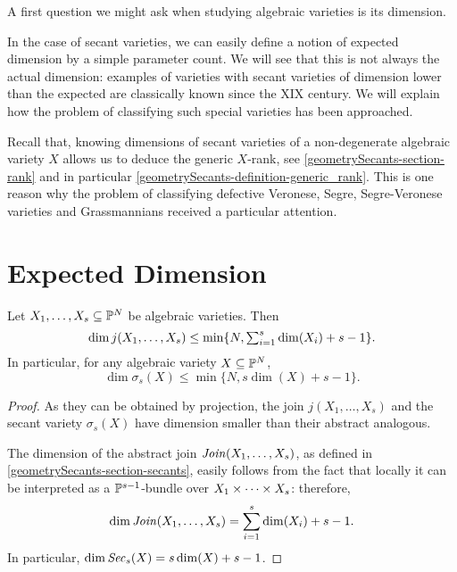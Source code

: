 
A first question we might ask when studying algebraic varieties is its dimension. 

In the case of secant varieties, we can easily define a notion of expected dimension by a simple parameter count. We will see that this is not always the actual dimension: examples of varieties with secant varieties of dimension lower than the expected are classically known since the XIX century. We will explain how the problem of classifying such special varieties has been approached.

Recall that, knowing dimensions of secant varieties of a non-degenerate algebraic variety $X$ allows us to deduce the generic $X$-rank, see \ref{geometrySecants-section-rank} and in particular \ref{geometrySecants-definition-generic_rank}. This is one reason why the problem of classifying defective Veronese, Segre, Segre-Veronese varieties and Grassmannians received a particular attention. 

\section{Expected Dimension}
\label{geometrySecants-section-expectedDimension}

\begin{lemma}
\label{geometrySecants-lemma-expecteddimension}
Let $X_1, \ldots , X_s \subseteq \mathbb{P}^N$ be algebraic varieties. Then 
\[
    \dim j(X_1, \ldots , X_s) \leq \min\{ N, \textstyle\sum_{i=1}^s \dim(X_i) + s-1\}.
\]
In particular, for any algebraic variety $X \subseteq \mathbb{P}^N$,  
\[
    \dim \sigma_s(X) \leq \min\{ N , s\dim(X) + s - 1\}.
\]
\end{lemma}
\begin{proof}
As they can be obtained by projection, the join $j(X_1,\ldots,X_s)$ and the secant variety $\sigma_s(X)$ have dimension smaller than their abstract analogous.

The dimension of the abstract join $\mathit{Join}(X_1,\ldots,X_s)$, as defined in \ref{geometrySecants-section-secants}, easily follows from the fact that locally it can be interpreted as a $\mathbb{P}^{s-1}$-bundle over $X_1 \times \cdots \times X_s$: therefore, 
    \[
        \dim \mathit{Join}(X_1,\ldots,X_s) = \sum_{i=1}^s \dim(X_i) + s-1.
    \]
    In particular, $\dim \mathit{Sec}_s(X) = s\dim(X) + s-1$.
\end{proof}

